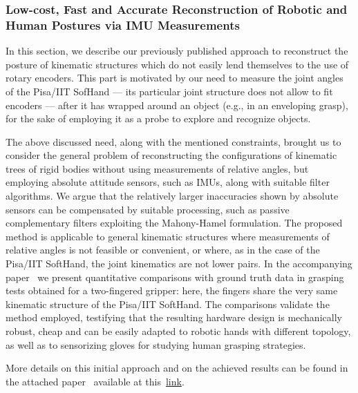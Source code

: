 
\subsubsection{Low-cost, Fast and Accurate Reconstruction of Robotic and Human Postures via IMU Measurements}
\label{sec:IMUGlove}

In this section, we describe our previously published approach to reconstruct the posture of kinematic structures which do not easily lend themselves to the use of rotary encoders. This part is motivated by our need to measure the joint angles of the Pisa/IIT SofHand --- its particular joint structure does not allow to fit encoders ---  after it has wrapped around an object (e.g., in an enveloping grasp), for the sake of employing it as a probe to explore and recognize objects.

The above discussed need, along with the mentioned constraints, brought us to consider the general problem of reconstructing the configurations of kinematic trees of rigid bodies without using measurements of relative angles, but employing absolute attitude sensors, such as IMUs, along with suitable filter algorithms. We argue that the relatively larger inaccuracies shown by absolute sensors can be compensated by suitable processing, such as passive complementary filters exploiting the Mahony-Hamel formulation. The proposed method is applicable to general kinematic structures where measurements of relative angles is not feasible or convenient, or where, as in the case of the Pisa/IIT SoftHand, the joint kinematics are not lower pairs. In the accompanying paper~\cite{Santaera:ICRA:2015} we present quantitative comparisons with ground truth data in grasping tests obtained for a two-fingered gripper: here, the fingers share the very same kinematic structure of the Pisa/IIT SoftHand. The comparisons validate the method employed, testifying that the resulting hardware design is mechanically robust, cheap and can be easily adapted to robotic hands with different topology, as well as to sensorizing gloves for studying human grasping strategies.

More details on this initial approach and on the achieved results can be found in the attached paper~\cite{Santaera:ICRA:2015} available at this~\href{./attachedPapers/ReconstructionPosturesImuMeasurements.pdf}{link}.  